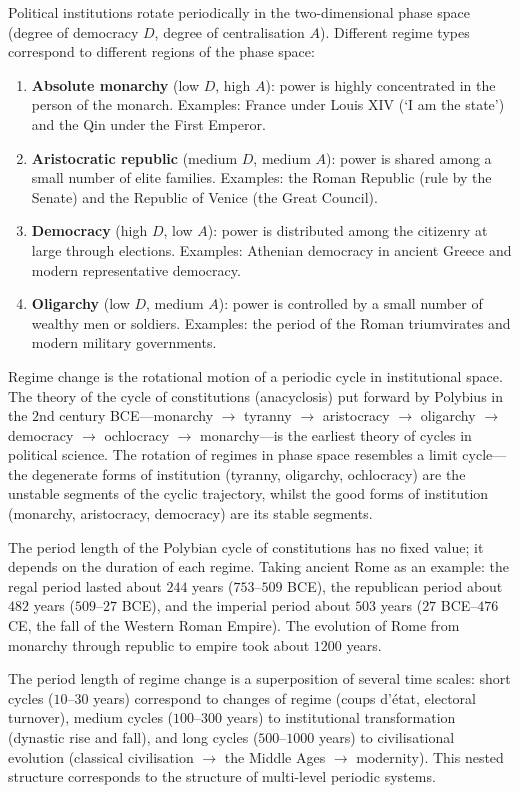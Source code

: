 \begin{definition}\label{def:regime_change}
Political institutions rotate periodically in the two-dimensional phase space (degree of democracy $D$, degree of centralisation $A$). Different regime types correspond to different regions of the phase space:
\begin{enumerate}[label=(\roman*)]
    \item \textbf{Absolute monarchy} (low $D$, high $A$): power is highly concentrated in the person of the monarch. Examples: France under Louis XIV (`I am the state') and the Qin under the First Emperor.
    \item \textbf{Aristocratic republic} (medium $D$, medium $A$): power is shared among a small number of elite families. Examples: the Roman Republic (rule by the Senate) and the Republic of Venice (the Great Council).
    \item \textbf{Democracy} (high $D$, low $A$): power is distributed among the citizenry at large through elections. Examples: Athenian democracy in ancient Greece and modern representative democracy.
    \item \textbf{Oligarchy} (low $D$, medium $A$): power is controlled by a small number of wealthy men or soldiers. Examples: the period of the Roman triumvirates and modern military governments.
\end{enumerate}
Regime change is the rotational motion of a periodic cycle in institutional space. The theory of the cycle of constitutions (anacyclosis) put forward by Polybius in the $2$nd century BCE---monarchy $\to$ tyranny $\to$ aristocracy $\to$ oligarchy $\to$ democracy $\to$ ochlocracy $\to$ monarchy---is the earliest theory of cycles in political science. The rotation of regimes in phase space resembles a limit cycle---the degenerate forms of institution (tyranny, oligarchy, ochlocracy) are the unstable segments of the cyclic trajectory, whilst the good forms of institution (monarchy, aristocracy, democracy) are its stable segments.
\end{definition}

\begin{proposition}\label{prop:regime_cycle_length}
The period length of the Polybian cycle of constitutions has no fixed value; it depends on the duration of each regime. Taking ancient Rome as an example: the regal period lasted about $244$ years ($753$--$509$ BCE), the republican period about $482$ years ($509$--$27$ BCE), and the imperial period about $503$ years ($27$ BCE--$476$ CE, the fall of the Western Roman Empire). The evolution of Rome from monarchy through republic to empire took about $1200$ years.

The period length of regime change is a superposition of several time scales: short cycles ($10$--$30$ years) correspond to changes of regime (coups d'état, electoral turnover), medium cycles ($100$--$300$ years) to institutional transformation (dynastic rise and fall), and long cycles ($500$--$1000$ years) to civilisational evolution (classical civilisation $\to$ the Middle Ages $\to$ modernity). This nested structure corresponds to the structure of multi-level periodic systems.
\end{proposition}

